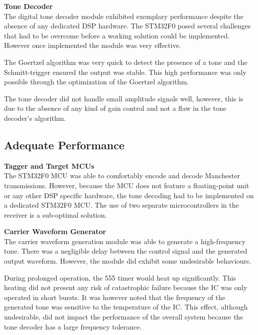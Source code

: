 \textbf{Tone Decoder}\\ %
The digital tone decoder module exhibited exemplary performance despite the absence of any dedicated DSP hardware. The STM32F0 posed several challenges that had to be overcome before a working solution could be implemented. However once implemented the module was very effective.

The Goertzel algorithm was very quick to detect the presence of a tone and the Schmitt-trigger ensured the output was stable. This high performance was only possible through the optimization of the Goertzel algorithm.

The tone decoder did not handle small amplitude signals well, however, this is due to the absence of any kind of gain control and not a flaw in the tone decoder's algorithm.

\subsection{Adequate Performance}

\textbf{Tagger and Target MCUs}\\
The STM32F0 MCU was able to comfortably encode and decode Manchester transmissions. However, because the MCU does not feature a floating-point unit or any other DSP specific hardware, the tone decoding had to be implemented on a dedicated STM32F0 MCU. The use of two separate microcontrollers in the receiver is a sub-optimal solution.


\textbf{Carrier Waveform Generator}\\
The carrier waveform generation module was able to generate a high-frequency tone. There was a negligible delay between the control signal and the generated output waveform. However, the module did exhibit some undesirable behaviours.

During prolonged operation, the 555 timer would heat up significantly. This heating did not present any risk of catastrophic failure because the IC was only operated in short bursts. It was however noted that the frequency of the generated tone was sensitive to the temperature of the IC. This effect, although undesirable, did not impact the performance of the overall system because the tone decoder has a large frequency tolerance. 

